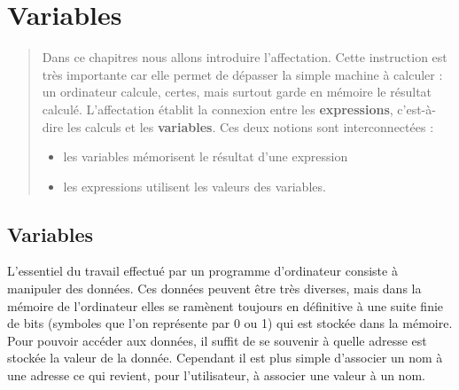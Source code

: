 \chapter{Variables}
\thispagestyle{empty}
\begin{abstract}Dans ce chapitres nous allons introduire l'affectation. Cette instruction est très importante car elle permet de dépasser la simple machine à calculer : un ordinateur calcule, certes, mais surtout garde en mémoire le résultat calculé. L'affectation établit la connexion entre les {\bf expressions}, c'est-à-dire les calculs et les {\bf variables}. Ces deux notions sont interconnectées :
\begin{itemize}
	\item les variables mémorisent le résultat d'une expression
	\item les expressions utilisent les valeurs des variables.
\end{itemize}
\end{abstract}
\section{Variables}
L'essentiel du travail effectué par un programme d'ordinateur consiste à  manipuler des données. Ces données peuvent être très diverses, mais dans la mémoire de l'ordinateur elles se ramènent toujours en définitive à  une suite finie de bits (symboles que l’on représente par 0 ou 1) qui est stockée dans la mémoire.  Pour pouvoir accéder aux données,  il suffit de se souvenir à quelle adresse est stockée la valeur de la donnée. Cependant il est plus simple d'associer un nom à une adresse ce qui revient, pour l'utilisateur, à associer une valeur à un nom.

